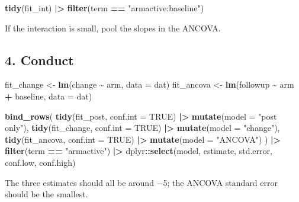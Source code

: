 \documentclass[
]{article}
\newenvironment{Shaded}{\begin{snugshade}}{\end{snugshade}}
\newcommand{\AttributeTok}[1]{\textcolor[rgb]{0.13,0.29,0.53}{#1}}
\newcommand{\ConstantTok}[1]{\textcolor[rgb]{0.56,0.35,0.01}{#1}}
\newcommand{\FunctionTok}[1]{\textcolor[rgb]{0.13,0.29,0.53}{\textbf{#1}}}
\newcommand{\NormalTok}[1]{#1}
\newcommand{\OtherTok}[1]{\textcolor[rgb]{0.56,0.35,0.01}{#1}}
\newcommand{\SpecialCharTok}[1]{\textcolor[rgb]{0.81,0.36,0.00}{\textbf{#1}}}
\newcommand{\StringTok}[1]{\textcolor[rgb]{0.31,0.60,0.02}{#1}}
\begin{document}
\begin{Shaded}
\begin{Highlighting}[]
\FunctionTok{tidy}\NormalTok{(fit\_int) }\SpecialCharTok{|\textgreater{}} \FunctionTok{filter}\NormalTok{(term }\SpecialCharTok{==} \StringTok{"armactive:baseline"}\NormalTok{)}
\end{Highlighting}
\end{Shaded}

If the interaction is small, pool the slopes in the ANCOVA.

\subsection{4. Conduct}\label{conduct}

\begin{Shaded}
\begin{Highlighting}[]
\NormalTok{fit\_change }\OtherTok{\textless{}{-}} \FunctionTok{lm}\NormalTok{(change }\SpecialCharTok{\textasciitilde{}}\NormalTok{ arm, }\AttributeTok{data =}\NormalTok{ dat)}
\NormalTok{fit\_ancova }\OtherTok{\textless{}{-}} \FunctionTok{lm}\NormalTok{(followup }\SpecialCharTok{\textasciitilde{}}\NormalTok{ arm }\SpecialCharTok{+}\NormalTok{ baseline, }\AttributeTok{data =}\NormalTok{ dat)}

\FunctionTok{bind\_rows}\NormalTok{(}
  \FunctionTok{tidy}\NormalTok{(fit\_post, }\AttributeTok{conf.int =} \ConstantTok{TRUE}\NormalTok{) }\SpecialCharTok{|\textgreater{}} \FunctionTok{mutate}\NormalTok{(}\AttributeTok{model =} \StringTok{"post only"}\NormalTok{),}
  \FunctionTok{tidy}\NormalTok{(fit\_change, }\AttributeTok{conf.int =} \ConstantTok{TRUE}\NormalTok{) }\SpecialCharTok{|\textgreater{}} \FunctionTok{mutate}\NormalTok{(}\AttributeTok{model =} \StringTok{"change"}\NormalTok{),}
  \FunctionTok{tidy}\NormalTok{(fit\_ancova, }\AttributeTok{conf.int =} \ConstantTok{TRUE}\NormalTok{) }\SpecialCharTok{|\textgreater{}} \FunctionTok{mutate}\NormalTok{(}\AttributeTok{model =} \StringTok{"ANCOVA"}\NormalTok{)}
\NormalTok{) }\SpecialCharTok{|\textgreater{}}
  \FunctionTok{filter}\NormalTok{(term }\SpecialCharTok{==} \StringTok{"armactive"}\NormalTok{) }\SpecialCharTok{|\textgreater{}}
\NormalTok{  dplyr}\SpecialCharTok{::}\FunctionTok{select}\NormalTok{(model, estimate, std.error, conf.low, conf.high)}
\end{Highlighting}
\end{Shaded}

The three estimates should all be around −5; the ANCOVA standard error
should be the smallest.
\end{document}
